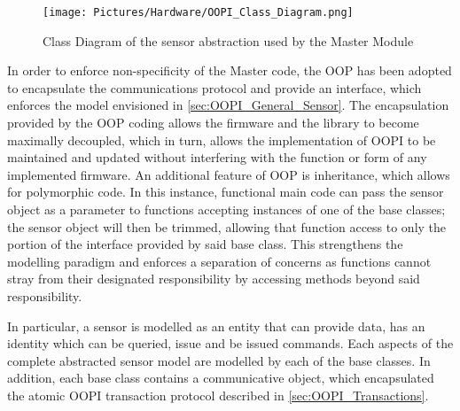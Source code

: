 \begin{figure}
    \centering
    \texttt{[image: Pictures/Hardware/OOPI\_Class\_Diagram.png]}
    \caption{Class Diagram of the sensor abstraction used by the Master Module}
    \label{fig:OOPI_Class_Diagram}
\end{figure}

In order to enforce non-specificity of the Master code, the \gls{OOP} has been adopted to encapsulate the communications protocol and provide an interface, which enforces the model envisioned in \cref{sec:OOPI_General_Sensor}. The encapsulation provided by the \gls{OOP} coding allows the firmware and the library to become maximally decoupled, which in turn, allows the implementation of OOPI to be maintained and updated without interfering with the function or form of any implemented firmware. An additional feature of OOP is inheritance, which allows for polymorphic code. In this instance, functional main code can pass the sensor object as a parameter to functions accepting instances of one of the base classes; the sensor object will then be trimmed, allowing that function access to only the portion of the interface provided by said base class. This strengthens the modelling paradigm and enforces a separation of concerns as functions cannot stray from their designated responsibility by accessing methods beyond said responsibility. 

In particular, a sensor is modelled as an entity that can provide data, has an identity which can be queried, issue and be issued commands. Each aspects of the complete abstracted sensor model are modelled by each of the base classes. In addition, each base class contains a communicative object, which encapsulated the atomic OOPI transaction protocol described in \cref{sec:OOPI_Transactions}.
% 
